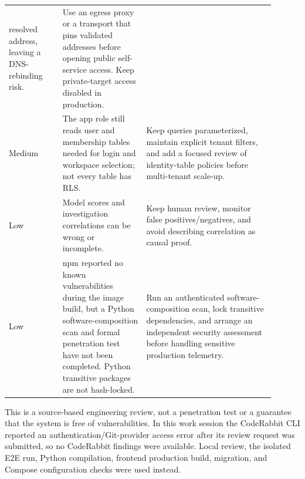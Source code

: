 \documentclass[11pt,a4paper]{article}
\begin{document}
\begin{longtable}{p{0.18\linewidth}p{0.29\linewidth}p{0.43\linewidth}}
resolved address, leaving a DNS-rebinding risk. & Use an egress proxy or a
transport that pins validated addresses before opening public self-service
access. Keep private-target access disabled in production. \\
Medium & The app role still reads user and membership tables needed for login
and workspace selection; not every table has RLS. & Keep queries parameterized,
maintain explicit tenant filters, and add a focused review of identity-table
policies before multi-tenant scale-up. \\
Low & Model scores and investigation correlations can be wrong or incomplete. &
Keep human review, monitor false positives/negatives, and avoid describing
correlation as causal proof. \\
Low & npm reported no known vulnerabilities during the image build, but a
Python software-composition scan and formal penetration test have not been
completed. Python transitive packages are not hash-locked. & Run an authenticated
software-composition scan, lock transitive dependencies, and arrange an
independent security assessment before handling sensitive production telemetry. \\
\bottomrule
\end{longtable}

This is a source-based engineering review, not a penetration test or a guarantee
that the system is free of vulnerabilities. In this work session the CodeRabbit
CLI reported an authentication/Git-provider access error after its review
request was submitted, so no CodeRabbit findings were available. Local review,
the isolated E2E run, Python compilation, frontend production build, migration,
and Compose configuration checks were used instead.
\end{document}
